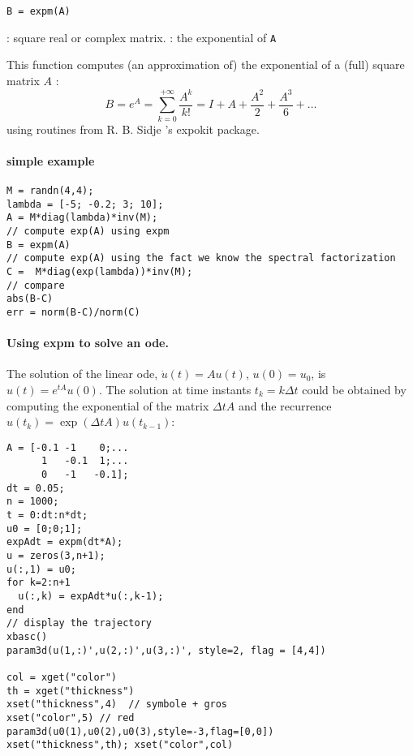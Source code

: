 
\begin{mandesc}
\end{mandesc}

\begin{calling_sequence}
\begin{verbatim}
B = expm(A)
\end{verbatim}
\end{calling_sequence}
\begin{parameters}
  \begin{varlist}
    :  square real or complex matrix.
    :  the exponential of \verb+A+
  \end{varlist}
\end{parameters}

\begin{mandescription}
This function computes (an approximation of) the exponential of a (full) square matrix $A$ :
$$
   B = e^A = \sum_{k=0}^{+\infty} \frac{A^k}{k !} = I + A + \frac{A^2}{2} + \frac{A^3}{6} + \dots
$$
using routines from R. B. Sidje 's expokit package.
\end{mandescription}

\begin{examples}

\paragraph{simple example}
\begin{Verbatim}
M = randn(4,4);
lambda = [-5; -0.2; 3; 10];
A = M*diag(lambda)*inv(M);
// compute exp(A) using expm 
B = expm(A)
// compute exp(A) using the fact we know the spectral factorization
C =  M*diag(exp(lambda))*inv(M);
// compare
abs(B-C)
err = norm(B-C)/norm(C)
\end{Verbatim}

\paragraph{Using expm to solve an ode.} The solution of the linear ode, $\dot{u}(t) = A u(t)$, $u(0)=u_0$,
is $u(t) = e^{tA} u(0)$. The solution at time instants $t_k = k \Delta t$ could be
obtained by computing the exponential of the matrix $\Delta t A$ and the recurrence 
$u(t_k) = \exp(\Delta t A) u(t_{k-1})$:  
\begin{Verbatim}
A = [-0.1 -1    0;...
      1   -0.1  1;...
      0   -1   -0.1];
dt = 0.05;
n = 1000;
t = 0:dt:n*dt;
u0 = [0;0;1];
expAdt = expm(dt*A);
u = zeros(3,n+1);
u(:,1) = u0;
for k=2:n+1
  u(:,k) = expAdt*u(:,k-1);
end
// display the trajectory
xbasc()
param3d(u(1,:)',u(2,:)',u(3,:)', style=2, flag = [4,4])

col = xget("color")
th = xget("thickness")
xset("thickness",4)  // symbole + gros
xset("color",5) // red
param3d(u0(1),u0(2),u0(3),style=-3,flag=[0,0]) 
xset("thickness",th); xset("color",col)
\end{Verbatim}
\end{examples}


